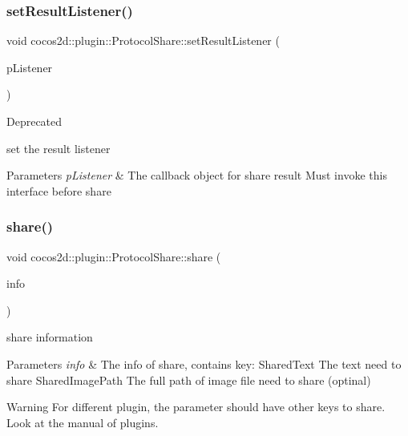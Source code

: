 \subsubsection{\texorpdfstring{set\+Result\+Listener()}{setResultListener()}}
{\footnotesize\ttfamily void cocos2d\+::plugin\+::\+Protocol\+Share\+::set\+Result\+Listener (\begin{DoxyParamCaption}\item[{\hyperlink{classcocos2d_1_1plugin_1_1ShareResultListener}{Share\+Result\+Listener} $\ast$}]{p\+Listener }\end{DoxyParamCaption})}

\begin{DoxyRefDesc}{Deprecated}
\item[\hyperlink{deprecated__deprecated000234}{Deprecated}]set the result listener \end{DoxyRefDesc}

\begin{DoxyParams}{Parameters}
{\em p\+Listener} & The callback object for share result  Must invoke this interface before share \\
\hline
\end{DoxyParams}
\mbox{\label{classcocos2d_1_1plugin_1_1ProtocolShare_ac56cbc9a0aa15c6d9ec3c352866e1b5c}} 
\subsubsection{\texorpdfstring{share()}{share()}}
{\footnotesize\ttfamily void cocos2d\+::plugin\+::\+Protocol\+Share\+::share (\begin{DoxyParamCaption}\item[{T\+Share\+Info}]{info }\end{DoxyParamCaption})}



share information 


\begin{DoxyParams}{Parameters}
{\em info} & The info of share, contains key\+: Shared\+Text The text need to share Shared\+Image\+Path The full path of image file need to share (optinal) \\
\hline
\end{DoxyParams}
\begin{DoxyWarning}{Warning}
For different plugin, the parameter should have other keys to share. Look at the manual of plugins. 
\end{DoxyWarning}


